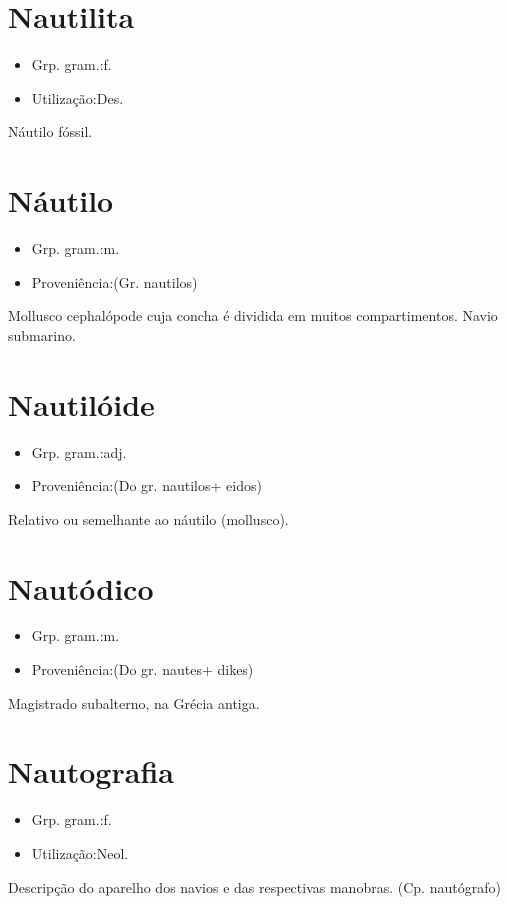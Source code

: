 \section{Nautilita}
\begin{itemize}
\item {Grp. gram.:f.}
\end{itemize}
\begin{itemize}
\item {Utilização:Des.}
\end{itemize}
Náutilo fóssil.
\section{Náutilo}
\begin{itemize}
\item {Grp. gram.:m.}
\end{itemize}
\begin{itemize}
\item {Proveniência:(Gr. \textunderscore nautilos\textunderscore )}
\end{itemize}
Mollusco cephalópode cuja concha é dividida em muitos compartimentos.
Navio submarino.
\section{Nautilóide}
\begin{itemize}
\item {Grp. gram.:adj.}
\end{itemize}
\begin{itemize}
\item {Proveniência:(Do gr. \textunderscore nautilos\textunderscore  + \textunderscore eidos\textunderscore )}
\end{itemize}
Relativo ou semelhante ao náutilo (mollusco).
\section{Nautódico}
\begin{itemize}
\item {Grp. gram.:m.}
\end{itemize}
\begin{itemize}
\item {Proveniência:(Do gr. \textunderscore nautes\textunderscore  + \textunderscore dikes\textunderscore )}
\end{itemize}
Magistrado subalterno, na Grécia antiga.
\section{Nautografia}
\begin{itemize}
\item {Grp. gram.:f.}
\end{itemize}
\begin{itemize}
\item {Utilização:Neol.}
\end{itemize}
Descripção do aparelho dos navios e das respectivas manobras.
(Cp. \textunderscore nautógrafo\textunderscore )
